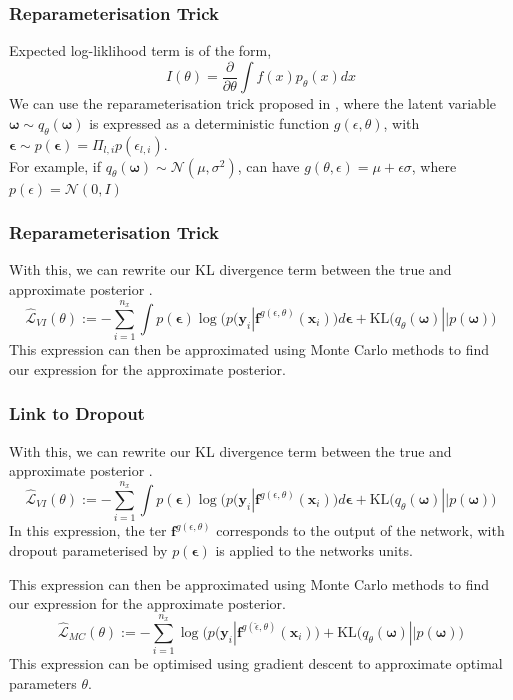 \documentclass{beamer}
\newcommand{\mb}[1]{\mathbf{#1}}
\begin{document}
% 
% 
% 
% 
\begin{frame}
  \frametitle{Reparameterisation Trick}
  Expected log-liklihood term is of the form,
  \begin{equation*}
    I(\theta) = \dfrac{\partial}{\partial \theta} \int f(x) p_\theta(x) dx
  \end{equation*}
  We can use the reparameterisation trick proposed in \cite{kingma2013}, where the latent variable $\mb{\omega} \sim q_\theta(\mb{\omega})$ is expressed as a deterministic function $g(\epsilon, \theta)$, with $\mb{\epsilon} \sim p(\mb{\epsilon}) = \Pi_{l,i} p(\epsilon_{l,i})$.
  \\
  \vspace*{0.5cm}
  For example, if $q_\theta(\mb{\omega}) \sim \mathcal{N}(\mu, \sigma^2)$, can have $g(\theta, \epsilon) = \mu + \epsilon \sigma$, where $p(\epsilon) = \mathcal{N}(0, I)$
\end{frame}
% 
% 
% 
% 
% 
\begin{frame}
  \frametitle{Reparameterisation Trick}
  With this, we can rewrite our KL divergence term between the true and approximate posterior \cite{gal2016}.
  \begin{equation*}
    \hat{\mathcal{L}}_{VI}(\theta) := - \sum_{i=1}^{n_x}\int p(\mb{\epsilon})
    \log\Big( p(\mb{y}_i | \mb{f}^{g(\epsilon, \theta)} (\mb{x}_i) \Big) d\mb{\epsilon} +
    \text{KL}\Big( q_\theta (\mb{\omega}) || p (\mb{\omega}) \Big)
  \end{equation*}  
  This expression can then be approximated using Monte Carlo methods to find our expression for the approximate posterior.
\end{frame}
% 
% 
% 
% 
% 
\begin{frame}
  \frametitle{Link to Dropout}
  With this, we can rewrite our KL divergence term between the true and approximate posterior \cite{gal2016}.
  \begin{equation*}
    \hat{\mathcal{L}}_{VI}(\theta) := - \sum_{i=1}^{n_x}\int p(\mb{\epsilon})
    \log\Big( p(\mb{y}_i | \mb{f}^{g(\epsilon, \theta)} (\mb{x}_i) \Big) d\mb{\epsilon} +
    \text{KL}\Big( q_\theta (\mb{\omega}) || p (\mb{\omega}) \Big)
  \end{equation*}
  In this expression, the ter $\mb{f}^{g(\epsilon, \theta)}$ corresponds to the output of the network, with dropout parameterised by $p(\mb{\epsilon}) $ is applied to the networks units.

  This expression can then be approximated using Monte Carlo methods to find our expression for the approximate posterior.
  \begin{equation*}
    \hat{\mathcal{L}}_{MC}(\theta) := - \sum_{i=1}^{n_x}
    \log\Big( p(\mb{y}_i | \mb{f}^{g(\hat{\epsilon}, \theta)} (\mb{x}_i) \Big)+
    \text{KL}\Big(q_\theta (\mb{\omega}) || p (\mb{\omega}) \Big)
  \end{equation*}
  This expression can be optimised using gradient descent to approximate optimal parameters $\theta$.
\end{frame}
\end{document}
